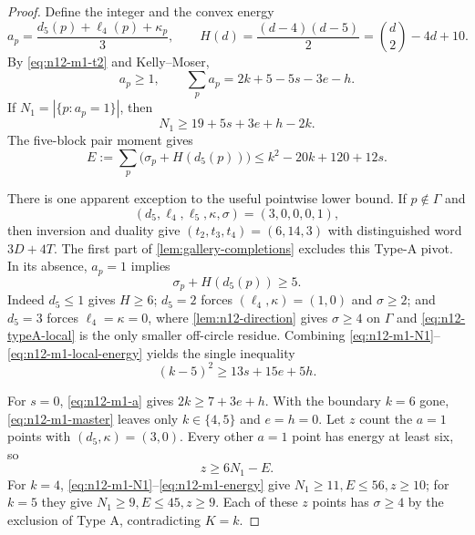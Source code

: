 \begin{proof}
Define the integer and the convex energy
\[
a_p=\frac{d_5(p)+\ell_4(p)+\kappa_p}{3},\qquad
H(d)=\frac{(d-4)(d-5)}2=\binom d2-4d+10.
\]
By \eqref{eq:n12-m1-t2} and Kelly--Moser,
\begin{equation}\label{eq:n12-m1-a}
a_p\ge1,\qquad
\sum_pa_p=2k+5-5s-3e-h.
\end{equation}
If $N_1=|\{p:a_p=1\}|$, then
\begin{equation}\label{eq:n12-m1-N1}
N_1\ge19+5s+3e+h-2k.
\end{equation}
The five-block pair moment gives
\begin{equation}\label{eq:n12-m1-energy}
E:=\sum_p\bigl(\sigma_p+H(d_5(p))\bigr)
 \le k^2-20k+120+12s.
\end{equation}

There is one apparent exception to the useful pointwise lower bound.  If
$p\notin\Gamma$ and
\begin{equation}\label{eq:n12-typeA-local}
(d_5,\ell_4,\ell_5,\kappa,\sigma)=(3,0,0,0,1),
\end{equation}
then inversion and duality give
$(t_2,t_3,t_4)=(6,14,3)$ with distinguished word $3D+4T$.  The first part
of \cref{lem:gallery-completions} excludes this Type-A pivot.  In its
absence, $a_p=1$ implies
\begin{equation}\label{eq:n12-m1-local-energy}
 \sigma_p+H(d_5(p))\ge5.
\end{equation}
Indeed $d_5\le1$ gives $H\ge6$; $d_5=2$ forces
$(\ell_4,\kappa)=(1,0)$ and $\sigma\ge2$; and $d_5=3$ forces
$\ell_4=\kappa=0$, where \cref{lem:n12-direction} gives $\sigma\ge4$ on
$\Gamma$ and \eqref{eq:n12-typeA-local} is the only smaller off-circle
residue.  Combining \eqref{eq:n12-m1-N1}--
\eqref{eq:n12-m1-local-energy} yields the single inequality
\begin{equation}\label{eq:n12-m1-master}
 (k-5)^2\ge13s+15e+5h.
\end{equation}

For $s=0$, \eqref{eq:n12-m1-a} gives $2k\ge7+3e+h$.  With the boundary
$k=6$ gone, \eqref{eq:n12-m1-master} leaves only
$k\in\{4,5\}$ and $e=h=0$.  Let $z$ count the $a=1$ points with
$(d_5,\kappa)=(3,0)$.  Every other $a=1$ point has energy at least six, so
\[
 z\ge6N_1-E.
\]
For $k=4$, \eqref{eq:n12-m1-N1}--\eqref{eq:n12-m1-energy} give
$N_1\ge11,E\le56,z\ge10$; for $k=5$ they give
$N_1\ge9,E\le45,z\ge9$.  Each of these $z$ points has $\sigma\ge4$ by
the exclusion of Type A, contradicting $K=k$.


\end{proof}
